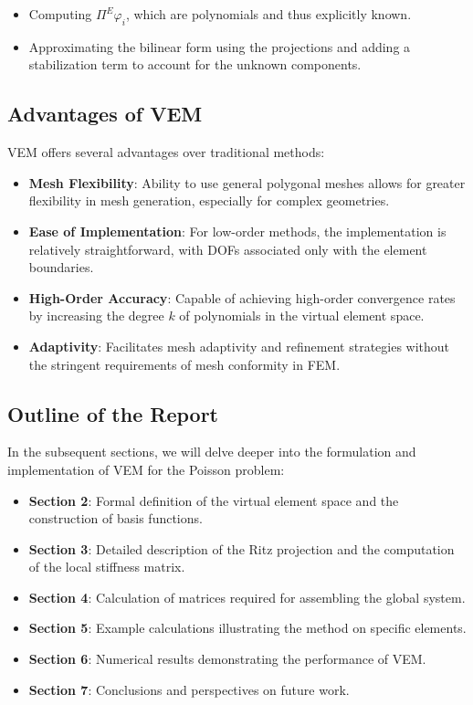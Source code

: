 \documentclass[class=article, crop=false]{standalone}
\begin{document}
\begin{itemize}
    \item Computing $\Pi^E \varphi_i$, which are polynomials and thus explicitly known.
    \item Approximating the bilinear form using the projections and adding a stabilization term to account for the unknown components.
\end{itemize}

\subsection{Advantages of VEM}

VEM offers several advantages over traditional methods:

\begin{itemize}
    \item \textbf{Mesh Flexibility}: Ability to use general polygonal meshes allows for greater flexibility in mesh generation, especially for complex geometries.
    \item \textbf{Ease of Implementation}: For low-order methods, the implementation is relatively straightforward, with DOFs associated only with the element boundaries.
    \item \textbf{High-Order Accuracy}: Capable of achieving high-order convergence rates by increasing the degree $k$ of polynomials in the virtual element space.
    \item \textbf{Adaptivity}: Facilitates mesh adaptivity and refinement strategies without the stringent requirements of mesh conformity in FEM.
\end{itemize}

\subsection{Outline of the Report}

In the subsequent sections, we will delve deeper into the formulation and implementation of VEM for the Poisson problem:

\begin{itemize}
    \item \textbf{Section 2}: Formal definition of the virtual element space and the construction of basis functions.
    \item \textbf{Section 3}: Detailed description of the Ritz projection and the computation of the local stiffness matrix.
    \item \textbf{Section 4}: Calculation of matrices required for assembling the global system.
    \item \textbf{Section 5}: Example calculations illustrating the method on specific elements.
    \item \textbf{Section 6}: Numerical results demonstrating the performance of VEM.
    \item \textbf{Section 7}: Conclusions and perspectives on future work.
\end{itemize}
\end{document}
